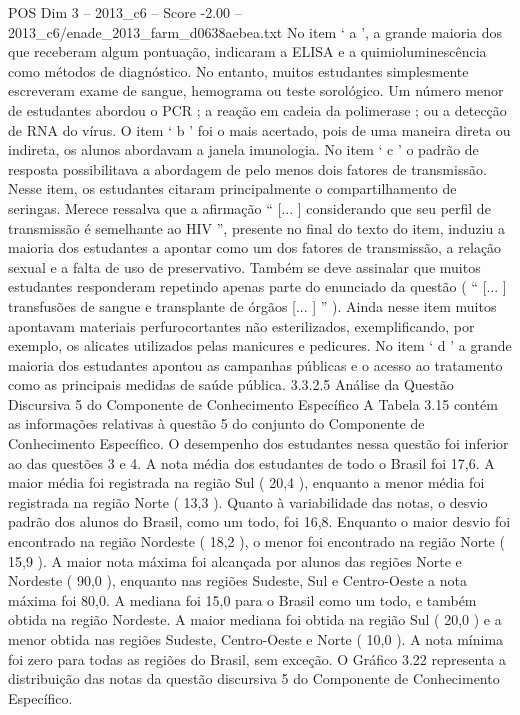 \begin{textsample}{POS Dim 3 – 2013\_c6 – Score -2.00 – 2013\_c6/enade\_2013\_farm\_d0638aebea.txt}
No item ‘ a ’, a grande maioria dos que receberam algum pontuação, indicaram a ELISA e a quimioluminescência como métodos de diagnóstico.
No entanto, muitos estudantes simplesmente escreveram exame de sangue, hemograma ou teste sorológico.
Um número menor de estudantes abordou o PCR ; a reação em cadeia da polimerase ; ou a detecção de RNA do vírus.
O item ‘ b ’ foi o mais acertado, pois de uma maneira direta ou indireta, os alunos abordavam a janela imunologia.
No item ‘ c ’ o padrão de resposta possibilitava a abordagem de pelo menos dois fatores de transmissão.
Nesse item, os estudantes citaram principalmente o compartilhamento de seringas.
Merece ressalva que a afirmação “ [... ] considerando que seu perfil de transmissão é semelhante ao HIV ”, presente no final do texto do item, induziu a maioria dos estudantes a apontar como um dos fatores de transmissão, a relação sexual e a falta de uso de preservativo.
Também se deve assinalar que muitos estudantes responderam repetindo apenas parte do enunciado da questão ( “ [... ] transfusões de sangue e transplante de órgãos [... ] ” ).
Ainda nesse item muitos apontavam materiais perfurocortantes não esterilizados, exemplificando, por exemplo, os alicates utilizados pelas manicures e pedicures.
No item ‘ d ’ a grande maioria dos estudantes apontou as campanhas públicas e o acesso ao tratamento como as principais medidas de saúde pública. 3.3.2.5 Análise da Questão Discursiva 5 do Componente de Conhecimento Específico A Tabela 3.15 contém as informações relativas à questão 5 do conjunto do Componente de Conhecimento Específico.
O desempenho dos estudantes nessa questão foi inferior ao das questões 3 e 4.
A nota média dos estudantes de todo o Brasil foi 17,6.
A maior média foi registrada na região Sul ( 20,4 ), enquanto a menor média foi registrada na região Norte ( 13,3 ).
Quanto à variabilidade das notas, o desvio padrão dos alunos do Brasil, como um todo, foi 16,8.
Enquanto o maior desvio foi encontrado na região Nordeste ( 18,2 ), o menor foi encontrado na região Norte ( 15,9 ).
A maior nota máxima foi alcançada por alunos das regiões Norte e Nordeste ( 90,0 ), enquanto nas regiões Sudeste, Sul e Centro-Oeste a nota máxima foi 80,0.
A mediana foi 15,0 para o Brasil como um todo, e também obtida na região Nordeste.
A maior mediana foi obtida na região Sul ( 20,0 ) e a menor obtida nas regiões Sudeste, Centro-Oeste e Norte ( 10,0 ).
A nota mínima foi zero para todas as regiões do Brasil, sem exceção.
O Gráfico 3.22 representa a distribuição das notas da questão discursiva 5 do Componente de Conhecimento Específico.

\end{textsample}

